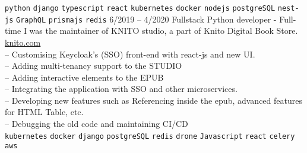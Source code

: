 \documentclass[9pt]{developercv}
\begin{document}
\begin{entrylist}
{		\texttt{python}\slashsep
		\texttt{django}\slashsep
		\texttt{typescript}\slashsep
		\texttt{react}\slashsep
		\texttt{kubernetes}\slashsep
		\texttt{docker}\slashsep
		\texttt{nodejs}\slashsep
		\texttt{postgreSQL}\slashsep
		\texttt{nest-js}\slashsep
		\texttt{GraphQL}\slashsep
		\texttt{prismajs}\slashsep
		\texttt{redis}\slashsep
		}
		\entry
		{6/2019 -- 4/2020}
		{Fullstack Python developer - Full-time}
		{}
		{
			I was the maintainer of KNITO studio, a part of Knito Digital Book Store.
			\href{https://knito.com/}{knito.com} \\
		-- Customising Keycloak's (SSO) front-end with react-js and new UI. \\
		-- Adding multi-tenancy support to the STUDIO \\
		-- Adding interactive elements to the EPUB \\
		-- Integrating the application with SSO and other microservices. \\
		-- Developing new features such as Referencing inside the epub, advanced features for HTML Table, etc. \\
		-- Debugging the old code and maintaining CI/CD \\
		\texttt{kubernetes}\slashsep
		\texttt{docker}\slashsep
		\texttt{django}\slashsep
		\texttt{postgreSQL}\slashsep
		\texttt{redis}\slashsep
		\texttt{drone}\slashsep
		\texttt{Javascript}\slashsep
		\texttt{react}\slashsep
		\texttt{celery}\slashsep
		\texttt{aws}\slashsep
	}

\end{entrylist}
\end{document}
